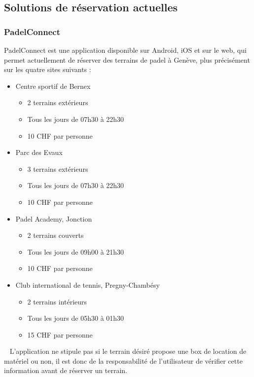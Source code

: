 \documentclass[12pt]{article}
\begin{document}
\subsection{Solutions de réservation actuelles}
\subsubsection{PadelConnect}
PadelConnect est une application disponible sur Android, iOS et sur le web, qui permet actuellement de réserver des terrains de padel à Genève, plus précisément sur les quatre sites suivants :
\newline
\begin{itemize}
    \item Centre sportif de Bernex 
    \begin{itemize}
        \item 2 terrains extérieurs
        \item Tous les jours de 07h30 à 22h30 
        \item 10 CHF par personne
    \end{itemize}
    \item Parc des Evaux
    \begin{itemize}
        \item 3 terrains extérieurs
        \item Tous les jours de 07h30 à 22h30
        \item 10 CHF par personne
    \end{itemize} 
    \item Padel Academy, Jonction
    \begin{itemize}
        \item 2 terrains couverts
        \item Tous les jours de 09h00 à 21h30
        \item 10 CHF par personne
    \end{itemize}
    \item Club international de tennis, Pregny-Chambésy
    \begin{itemize}
        \item 2 terrains intérieurs
        \item Tous les jours de 05h30 à 01h30
        \item 15 CHF par personne
    \end{itemize}
\end{itemize}\
\newline
L'application ne stipule pas si le terrain désiré propose une box de location de matériel ou non, il est donc de la responsabilité de l'utilisateur de vérifier cette information avant de réserver un terrain. 
\end{document}
